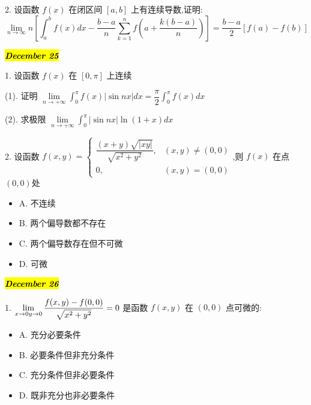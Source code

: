 2. 设函数 $f(x)$ 在闭区间 $[a,b]$ 上有连续导数,证明:
$$\lim\limits_{n\to\infty}n[\int_{a}^{b}f(x)dx-\dfrac{b-a}{n}\sum\limits_{k=1}^{n}f(a+\dfrac{k(b-a)}{n})]=\dfrac{b-a}{2}[f(a)-f(b)]$$
\begin{solution}
	
\end{solution}

\hl{\textbf{\textit{December 25}}}

1. 设函数 $f(x)$ 在 $[0,\pi]$ 上连续

(1). 证明 $\displaystyle{\lim\limits_{n\to +\infty}\int_{0}^{\pi}f(x)|\sin nx|dx=\dfrac{\pi}{2}\int_{0}^{\pi}f(x)dx}$

(2). 求极限 $\displaystyle{\lim\limits_{n\to +\infty}\int_{0}^{\pi}|\sin nx|\ln(1+x)dx}$ 
\begin{solution}
	
\end{solution}

2. 设函数 $f(x,y)=
\begin{cases}
	\dfrac{(x+y)\sqrt{|xy|}}{\sqrt{x^{2}+y^{2}}}, &(x,y)\neq (0,0)\\
	0, &(x,y)=(0,0)
\end{cases}$,则 $f(x)$ 在点 $(0,0)$处
\begin{itemize}
	\item A. 不连续
	\item B. 两个偏导数都不存在
	\item C. 两个偏导数存在但不可微
	\item D. 可微
\end{itemize} 
\begin{solution}
	
\end{solution}

\hl{\textbf{\textit{December 26}}}

1. $\lim\limits_{x\to 0\\y\to 0}\dfrac{f(x,y)-f(0,0)}{\sqrt{x^{2}+y^{2}}}=0$ 是函数 $f(x,y)$ 在 $(0,0)$ 点可微的:
\begin{itemize}
	\item A. 充分必要条件
	\item B. 必要条件但非充分条件
	\item C. 充分条件但非必要条件
	\item D. 既非充分也非必要条件
\end{itemize} 
\begin{solution}
	
\end{solution}

